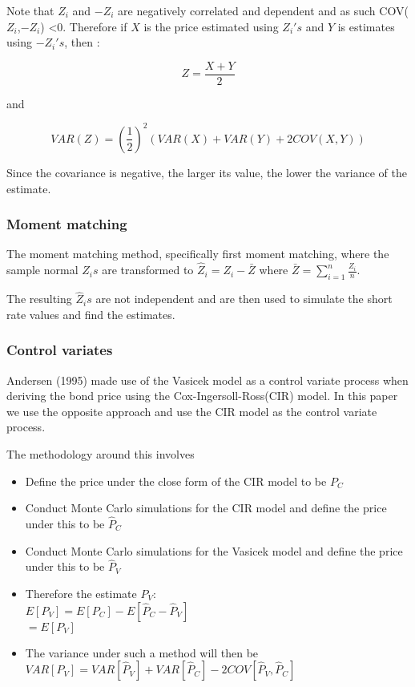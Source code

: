 \documentclass[12pt,a4paper]{article}
\begin{document}
Note that $Z_{i}$ and $-Z_{i}$ are negatively correlated and dependent and as such COV( $Z_{i}$,$-Z_{i}$) <0. Therefore if $X$ is the price estimated using $Z_i's$ and $Y$ is estimates using $-Z_i's$, then :

$$Z =\frac{X+Y}{2}$$

and 

$$VAR(Z)=(\frac{1}{2})^{2}(VAR(X)+VAR(Y)+2COV(X,Y))$$

Since the covariance is negative, the larger its value, the lower the variance of the estimate.

\subsubsection{Moment matching}
The moment matching method, specifically first moment matching, where the sample normal $Z_{i}s$ are transformed to $\hat{Z}_{i}=Z_{i}-\bar{Z}$ where $\bar{Z}=\sum_{i=1}^{n}\frac{Z_{i}}{n}$.

The resulting $\hat{Z}_{i}s$ are not independent and are then used to simulate the short rate values and find the estimates.   

 

\subsubsection{Control variates}
Andersen (1995) made use of the Vasicek model as a control variate process when deriving the bond price using the Cox-Ingersoll-Ross(CIR) model. In this paper we use the opposite approach and use the CIR model as the control variate process.

The methodology around this involves

\begin{itemize}
	
	\item Define the price under the close form of the CIR model to be $P_{C}$
	\item Conduct Monte Carlo simulations for the CIR model and define the price under this to be $\hat{P}_{C}$
	\item Conduct Monte Carlo simulations for the Vasicek model and define the price under this to be $\hat{P}_{V}$
	\item Therefore the estimate $P_{V}$:
		  \\$E[P_{V}]=E[P_{C}]-E[\hat{P}_{C}-\hat{P}_{V}]$
		         \\ $= E[P_{V}]$
	\item The variance under such a method will then be 
	\\$VAR[P_{V}]=VAR[\hat{P}_{V}]+VAR[\hat{P}_{C}]-2COV[\hat{P}_{V},\hat{P}_{C}]$
	 
\end{itemize}
\end{document}
